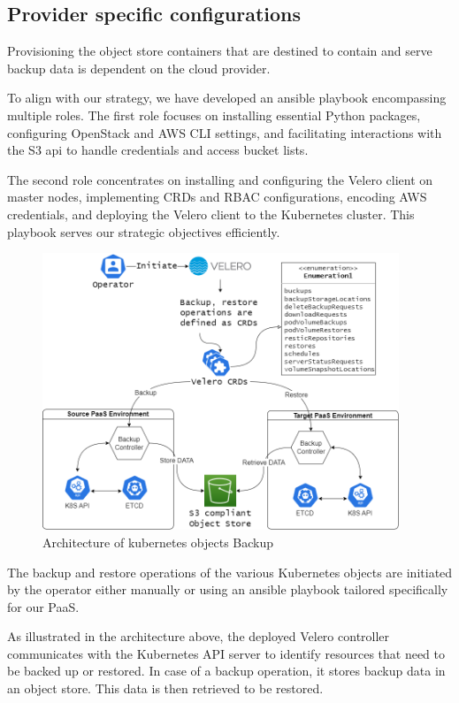 \subsection{Provider specific configurations }

Provisioning the object store containers that are destined to contain and serve backup data is dependent on the cloud provider.

To align with our strategy, we have developed an ansible playbook encompassing multiple roles. The first role focuses on installing essential Python packages, configuring OpenStack and AWS CLI settings, and facilitating interactions with the S3 api to handle credentials and access bucket lists.

The second role concentrates on installing and configuring the Velero client on master nodes, implementing CRDs and RBAC configurations, encoding AWS credentials, and deploying the Velero client to the Kubernetes cluster. This playbook serves our strategic objectives efficiently.

 \begin{figure}[H]\centering
\includegraphics[width=0.95\textwidth,angle=00]{assets/f57.png}
\caption{Architecture of kubernetes objects Backup }
\label{fig:f57}
\end{figure}

The backup and restore operations of the various Kubernetes objects are initiated by the operator either manually or using an ansible playbook tailored specifically for our PaaS. 

As illustrated in the architecture above, the deployed Velero controller communicates with the Kubernetes API server to identify resources that need to be backed up or restored. In case of a backup operation, it stores backup data in an object store. This data is then retrieved to be restored. 

